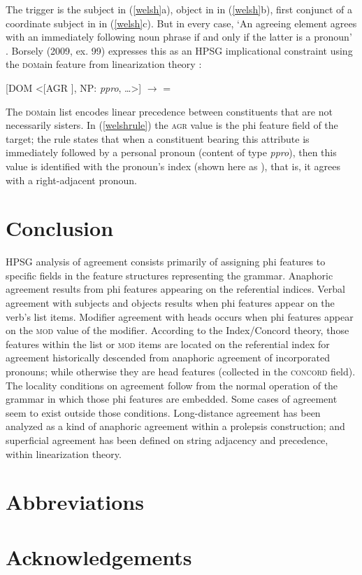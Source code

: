 \documentclass[output=paper]{langsci/langscibook}
\begin{document}
\noindent
The trigger is the subject in (\ref{welsh}a), object in in (\ref{welsh}b), first conjunct of a coordinate subject in in (\ref{welsh}c).  But in every case, `An agreeing element agrees with an immediately following noun phrase if and only if the latter is a pronoun' \citep[ex. \, 48]{Borsley:2009}.  Borsely (2009, ex. 99) expresses this as an HPSG implicational constraint using the \textsc{dom}ain feature from linearization theory \citep{reape:1994,Kathol:2000}:

\begin{exe}
\ex \label{welshrule}

[DOM  <[AGR ], NP: \textit{ppro}, \ldots >]  $\rightarrow$  = 
\end{exe}

\noindent
The \textsc{dom}ain list encodes linear precedence between constituents that are not necessarily sisters.  In (\ref{welshrule}) the \textsc{agr} value is the phi feature field of the target; the rule states that when a constituent bearing this attribute is immediately followed by a personal pronoun (content of type \textit{ppro}), then this value is identified with the pronoun's index (shown here as  ), that is, it agrees with a right-adjacent pronoun.  



\section{Conclusion} 

HPSG analysis of agreement consists primarily of assigning phi features to specific fields in the feature structures representing the grammar.  Anaphoric agreement results from phi features appearing on the referential indices.  Verbal agreement with subjects and objects results when phi features appear on the verb's \argst list items.  Modifier agreement with heads occurs when phi features appear on the \textsc{mod} value of the modifier.  According to the Index/Concord theory, those features within the \argst list or \textsc{mod} items are located  on the referential index for agreement historically descended from anaphoric agreement of incorporated pronouns; while otherwise they are head features (collected in the \textsc{concord} field).   The locality conditions on agreement follow from the normal operation of the grammar in which those phi features are embedded.  Some cases of agreement seem to exist outside those conditions.  Long-distance agreement has been analyzed as a kind of anaphoric agreement within a prolepsis construction; and superficial agreement has been defined on string adjacency and precedence, within linearization theory.  

\section*{Abbreviations}
\section*{Acknowledgements}




{\sloppy
\printbibliography[heading=subbibliography,notkeyword=this] 
}
\end{document}
